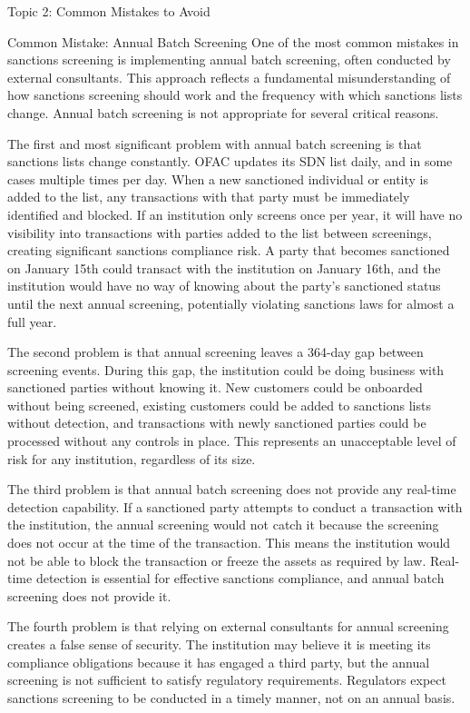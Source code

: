 \documentclass[5pt]{beamer}
\begin{document}
	\begin{frame}{Topic 2: Common Mistakes to Avoid}
		\begin{block}{\tiny Common Mistake: Annual Batch Screening}
			\tiny One of the most common mistakes in sanctions screening is implementing annual batch screening, often conducted by external consultants. This approach reflects a fundamental misunderstanding of how sanctions screening should work and the frequency with which sanctions lists change. Annual batch screening is not appropriate for several critical reasons.
			
			The first and most significant problem with annual batch screening is that sanctions lists change constantly. OFAC updates its SDN list daily, and in some cases multiple times per day. When a new sanctioned individual or entity is added to the list, any transactions with that party must be immediately identified and blocked. If an institution only screens once per year, it will have no visibility into transactions with parties added to the list between screenings, creating significant sanctions compliance risk. A party that becomes sanctioned on January 15th could transact with the institution on January 16th, and the institution would have no way of knowing about the party's sanctioned status until the next annual screening, potentially violating sanctions laws for almost a full year.
			
			The second problem is that annual screening leaves a 364-day gap between screening events. During this gap, the institution could be doing business with sanctioned parties without knowing it. New customers could be onboarded without being screened, existing customers could be added to sanctions lists without detection, and transactions with newly sanctioned parties could be processed without any controls in place. This represents an unacceptable level of risk for any institution, regardless of its size.
			
			The third problem is that annual batch screening does not provide any real-time detection capability. If a sanctioned party attempts to conduct a transaction with the institution, the annual screening would not catch it because the screening does not occur at the time of the transaction. This means the institution would not be able to block the transaction or freeze the assets as required by law. Real-time detection is essential for effective sanctions compliance, and annual batch screening does not provide it.
			
			The fourth problem is that relying on external consultants for annual screening creates a false sense of security. The institution may believe it is meeting its compliance obligations because it has engaged a third party, but the annual screening is not sufficient to satisfy regulatory requirements. Regulators expect sanctions screening to be conducted in a timely manner, not on an annual basis.
		\end{block}
	\end{frame}
	
\end{document}
